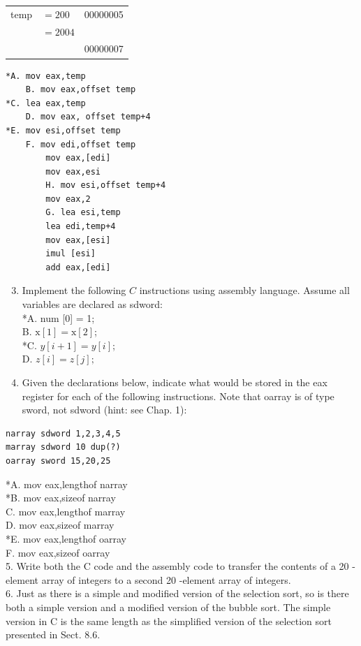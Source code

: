\documentclass[10pt]{book}
\begin{document}
\begin{center}
\begin{tabular}{rl|l|}
temp & $=200$ & 00000005 \\
 & $=2004$ &  \\
 &  & 00000007 \\
\hline
\end{tabular}
\end{center}

\begin{verbatim}
*A. mov eax,temp
    B. mov eax,offset temp
*C. lea eax,temp
    D. mov eax, offset temp+4
*E. mov esi,offset temp
    F. mov edi,offset temp
        mov eax,[edi]
        mov eax,esi
        H. mov esi,offset temp+4
        mov eax,2
        G. lea esi,temp
        lea edi,temp+4
        mov eax,[esi]
        imul [esi]
        add eax,[edi]
\end{verbatim}

\begin{enumerate}
  \setcounter{enumi}{2}
  \item Implement the following $C$ instructions using assembly language. Assume all variables are declared as sdword:\\[0pt]
*A. num [0] = 1;\\
B. $\mathrm{x}[1]=\mathrm{x}[2]$;\\
*C. $y[i+1]=y[i]$;\\
D. $z[i]=z[j] ;$
  \item Given the declarations below, indicate what would be stored in the eax register for each of the following instructions. Note that oarray is of type sword, not sdword (hint: see Chap. 1):
\end{enumerate}

\begin{verbatim}
narray sdword 1,2,3,4,5
marray sdword 10 dup(?)
oarray sword 15,20,25
\end{verbatim}

*A. mov eax,lengthof narray\\
*B. mov eax,sizeof narray\\
C. mov eax,lengthof marray\\
D. mov eax,sizeof marray\\
*E. mov eax,lengthof oarray\\
F. mov eax,sizeof oarray\\
5. Write both the C code and the assembly code to transfer the contents of a 20 -element array of integers to a second 20 -element array of integers.\\
6. Just as there is a simple and modified version of the selection sort, so is there both a simple version and a modified version of the bubble sort. The simple version in C is the same length as the simplified version of the selection sort presented in Sect. 8.6.\\
\end{document}
